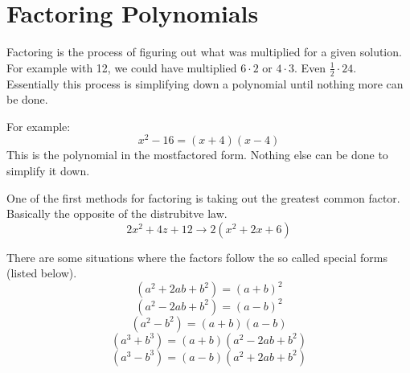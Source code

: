 \documentclass[12pt, letterpaper, oneside]{book}
\begin{document}
\section{Factoring Polynomials}
Factoring is the process of figuring out what was multiplied for a given solution. For example with 12, we could have multiplied $6\cdot2$ or $4\cdot3$. Even $\frac{1}{2}\cdot24$. Essentially this process is simplifying down a polynomial until nothing more can be done.

For example:
\[x^2 - 16 = (x+4)(x-4)\]
This is the polynomial in the mostfactored form. Nothing else can be done to simplify it down.

One of the first methods for factoring is taking out the greatest common factor. Basically the opposite of the distrubitve law.
\[2x^2+4z+12 \rightarrow 2(x^2+2x+6)\]

There are some situations where the factors follow the so called special forms (listed below).
\begin{equation}
    (a^2 + 2ab + b^2) = (a+b)^2
\end{equation}
\begin{equation}
    (a^2 - 2ab + b^2) = (a-b)^2
\end{equation}
\begin{equation}
    (a^2 - b^2) = (a+b)(a-b)
\end{equation}
\begin{equation}
    (a^3 + b^3) = (a+b)(a^2 - 2ab + b^2)
\end{equation}
\begin{equation}
    (a^3 - b^3) = (a-b)(a^2 + 2ab + b^2)
\end{equation}
\end{document}
